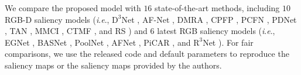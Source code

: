 \documentclass[journal]{IEEEtran}
\newcommand{\ie}{\textit{i}.\textit{e}.}
\begin{document}
We compare the proposed model with $16$ state-of-the-art methods, including $10$ RGB-D saliency models (\ie, $\text{D}^3$Net \cite{fan2019D3Net}, AF-Net \cite{wang2019adaptive}, DMRA \cite{Piao_2019_ICCV}, CPFP \cite{zhao2019contrast}, PCFN \cite{chen2018progressively}, PDNet \cite{zhu2019pdnet}, TAN \cite{chen2019three}, MMCI \cite{chen2019multi}, CTMF \cite{han2017cnns}, and RS \cite{shigematsu2017learning}) and $6$ latest RGB saliency models (\ie, EGNet \cite{zhao2019EGNet}, BASNet \cite{Qin_2019_CVPR}, PoolNet \cite{Liu2019PoolSal}, AFNet \cite{feng2019attentive}, PiCAR \cite{liu2018picanet}, and $\text{R}^3$Net \cite{deng2018r3net}).
For fair comparisons, we use the released code and default parameters to reproduce the saliency maps or the saliency maps provided by the authors.
\\ 
\end{document}
